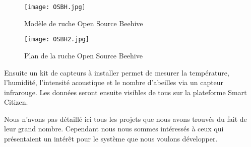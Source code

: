 \begin{figure}[h]
\centering\texttt{[image: OSBH.jpg]}
\caption{\label{fig:OSBH} Modèle de ruche Open Source Beehive}
\end{figure}

\begin{figure}[h]
\centering\texttt{[image: OSBH2.jpg]}
\caption{\label{fig:OSBH2} Plan de la ruche Open Source Beehive}
\end{figure}

Ensuite un kit de capteurs à installer permet de mesurer la température, l'humidité, l'intensité acoustique et le nombre d'abeilles via un capteur infrarouge. Les données seront ensuite visibles de tous sur la plateforme Smart Citizen.

Nous n'avons pas détaillé ici tous les projets que nous avons trouvés du fait de leur grand nombre. Cependant nous nous sommes intéressés à ceux qui présentaient un intérêt pour le système que nous voulons développer. 
